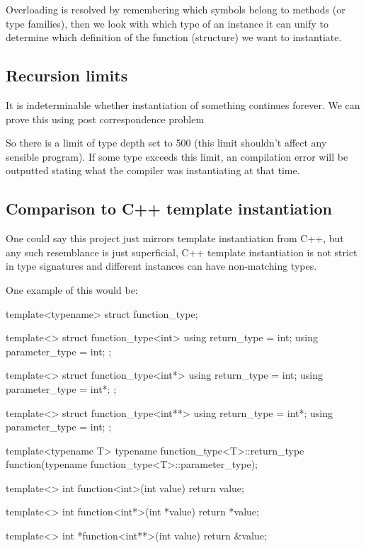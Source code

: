 Overloading is resolved by remembering which symbols belong to methods (or type families), then we look with which type of an
instance it can unify to determine which definition of the function (structure) we want to instantiate.

\subsection{Recursion limits}

It is indeterminable whether instantiation of something continues forever. We can prove this using post correspondence problem %

So there is a limit of type depth set to 500 (this limit shouldn't affect any sensible program).
If some type exceeds this limit, an compilation error will be outputted stating what the compiler was instantiating
at that time.

\subsection{Comparison to C++ template instantiation}

One could say this project just mirrors template instantiation from C++, but any such resemblance is just
superficial, C++ template instantiation is not strict in type signatures and different instances can have
non-matching types.

One example of this would be:

template<typename>
struct function_type;

template<>
struct function_type<int> { using return_type = int; using parameter_type = int; };

template<>
struct function_type<int*> { using return_type = int; using parameter_type = int*; };

template<>
struct function_type<int**> { using return_type = int*; using parameter_type = int; };

template<typename T>
typename function_type<T>::return_type function(typename function_type<T>::parameter_type);

template<>
int function<int>(int value) { return value; }

template<>
int function<int*>(int *value) { return *value; }

template<>
int *function<int**>(int value) { return &value; }

